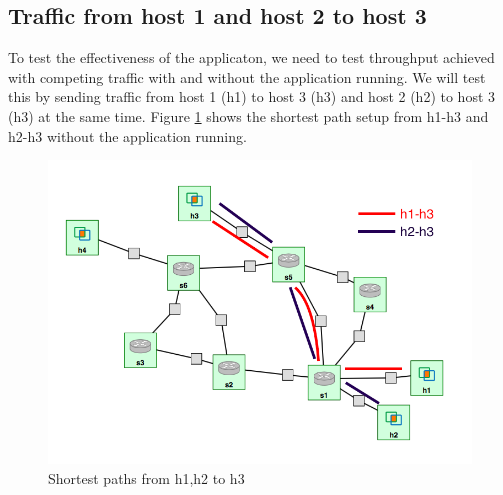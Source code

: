 \documentclass[paper=a4, fontsize=12pt]{scrartcl}	%
\numberwithin{equation}{section}		%
\numberwithin{figure}{section}			%
\numberwithin{table}{section}				%
\begin{document}
\subsection{Traffic from host 1 and host 2 to host 3}
To test the effectiveness of the applicaton, we need to test throughput achieved with competing traffic with and without the application running. We will test this by sending traffic from host 1 (h1) to host 3 (h3) and host 2 (h2) to host 3 (h3) at the same time. Figure \ref{Shorth3} shows the shortest path setup from h1-h3 and h2-h3 without the application running.
\begin{figure}[H]
\begin{center}
\includegraphics[scale=0.45]{shortest.png}   
\end{center}
 \caption{Shortest paths from h1,h2 to h3}
 \label{Shorth3}
\end{figure}
\end{document}
